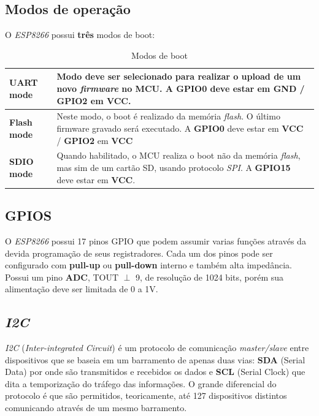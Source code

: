 \documentclass[
12pt,				%
openany,			%
twoside,			%
a4paper,			%
english,			%
french,				%
spanish,			%
brazil,				%
]{abntex2}
\begin{document}
\subsection{Modos de operação}
O \textit{ESP8266} possui \textbf{\textsf{três}} modos de boot: 

\begin{table}[!ht]
    \centering
    \footnotesize{
        \label{Modos-Energia}
        \caption{Modos de boot}
        \begin{tabular}{>{\bfseries}lp{5.35cm}}
            \toprule
            UART mode & Modo deve ser selecionado para realizar o upload de um novo \textit{firmware} no MCU. A \textbf{\textsf{GPIO0}} deve estar em \textbf{\textsf{GND} / \textbf{\textsf{GPIO2}} em \textbf{\textsf{VCC}}}. \\\midrule
            Flash mode & Neste modo, o boot é realizado da memória \textit{flash}. O último firmware gravado será executado. A \textbf{\textsf{GPIO0}} deve estar em \textbf{\textsf{VCC}} / \textbf{\textsf{GPIO2}} em \textbf{\textsf{VCC}} \\\midrule
            SDIO mode & Quando habilitado, o MCU realiza o boot não da memória \textit{flash}, mas sim de um cartão SD, usando protocolo \textit{SPI}. A \textbf{\textsf{GPIO15}} deve estar em \textbf{\textsf{VCC}}. \\\bottomrule
        \end{tabular}
    }
\end{table}

\subsection{GPIOS}

O \textit{ESP8266} possui 17 pinos GPIO que podem assumir varias funções através da devida programação de seus registradores. Cada um dos pinos pode ser configurado com \textbf{\textsf{pull-up}} ou \textbf{\textsf{pull-down}} interno e também alta impedância. Possui um pino \textbf{\textsf{ADC}}, TOUT $\perp$ 9, de resolução de 1024 bits, porém sua alimentação deve ser limitada de 0 a 1V.

\subsection{\textit{I2C}}
\textit{I2C} (\textit{Inter-integrated Circuit}) é um protocolo de comunicação \textit{master/slave} entre dispositivos que se baseia em um barramento de apenas duas vias: \textbf{\textsf{SDA}} (Serial Data) por onde são transmitidos e recebidos os dados e \textbf{\textsf{SCL}} (Serial Clock) que dita a temporização do tráfego das informações. O grande diferencial do protocolo é que são permitidos, teoricamente, até 127 dispositivos distintos comunicando através de um mesmo barramento.
\end{document}
